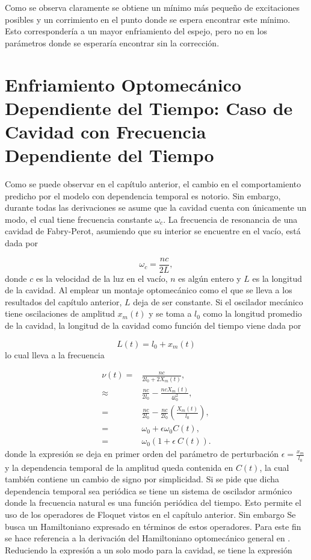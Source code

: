 \documentclass[10pt,a4paper]{report}
\begin{document}
Como se observa claramente se obtiene un mínimo más pequeño de excitaciones posibles y un corrimiento en el punto donde se espera encontrar este mínimo. Esto correspondería a un mayor enfriamiento del espejo, pero no en los parámetros donde se esperaría encontrar sin la corrección.


\chapter{Enfriamiento Optomecánico Dependiente del Tiempo: Caso de Cavidad con Frecuencia Dependiente del Tiempo}

Como se puede observar en el capítulo anterior, el cambio en el comportamiento predicho por el modelo con dependencia temporal es notorio. Sin embargo, durante todas las derivaciones se asume que la cavidad cuenta con únicamente un modo, el cual tiene  frecuencia constante $\omega_c$. La frecuencia de resonancia de una cavidad de Fabry-Perot, asumiendo que su interior se encuentre en el vacío, está dada por

\begin{equation}
\omega_c = \frac{nc}{2L},
\end{equation} donde $c$ es la velocidad de la luz en el vacío, $n$ es algún entero y $L$ es la longitud de la cavidad. Al emplear un montaje optomecánico como el que se lleva a los resultados del capítulo anterior, $L$ deja de ser constante. Si el oscilador mecánico tiene oscilaciones de amplitud $x_m(t)$ y se toma a $l_0$ como la longitud promedio de la cavidad, la longitud de la cavidad como función del tiempo viene dada por

\begin{equation}
L(t) = l_0 + x_m(t)
\end{equation} lo cual lleva a la frecuencia 

\begin{align}
\nu(t) =& \frac{nc}{2l_0+2X_m(t)}, \\
\approx& \frac{nc}{2l_0} - \frac{nc X_m(t)}{4l_0^2}, \\
=& \frac{nc}{2l_0} - \frac{nc}{2l_0}(\frac{X_m(t)}{l_0}), \\
=& \omega_0 + \epsilon\omega_0C(t), \\
=& \omega_0(1+\epsilon\ C(t)).
\end{align} donde la expresión se deja en primer orden del parámetro de perturbación $\epsilon = \frac{x_m}{l_0}$ y la dependencia temporal de la amplitud queda contenida en $C(t)$, la cual también contiene un cambio de signo por simplicidad. Si se pide que dicha dependencia temporal sea periódica se tiene un sistema de oscilador armónico donde la frecuencia natural es una función periódica del tiempo. Esto permite el uso de los operadores de Floquet vistos en el capítulo anterior. Sin embargo Se busca un Hamiltoniano  expresado en términos de estos operadores. Para este fin se hace referencia a la derivación del Hamiltoniano optomecánico general en \cite{LawOH}. Reduciendo la expresión a un solo modo para la cavidad, se tiene la expresión
\end{document}
